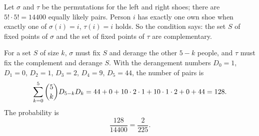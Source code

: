 Let $\sigma$ and $\tau$ be the permutations for the left and right shoes; there are $5!\cdot5!=14400$ equally likely pairs. Person $i$ has exactly one own shoe when exactly one of $\sigma(i)=i$, $\tau(i)=i$ holds. So the condition says: the set $S$ of fixed points of $\sigma$ and the set of fixed points of $\tau$ are complementary.

For a set $S$ of size $k$, $\sigma$ must fix $S$ and derange the other $5-k$ people, and $\tau$ must fix the complement and derange $S$. With the derangement numbers $D_0=1$, $D_1=0$, $D_2=1$, $D_3=2$, $D_4=9$, $D_5=44$, the number of pairs is
\[\sum_{k=0}^{5}\dbinom5kD_{5-k}D_k=44+0+10\cdot2\cdot1+10\cdot1\cdot2+0+44=128.\]
The probability is
\[\dfrac{128}{14400}=\boxed{\dfrac{2}{225}}.\]
